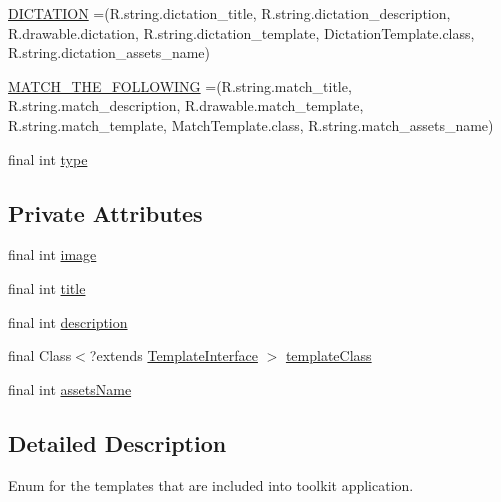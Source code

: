 \begin{DoxyCompactItemize}
\item 
\hyperlink{enumorg_1_1buildmlearn_1_1toolkit_1_1model_1_1Template_a878f3878c06d1f9e5c2719c0116f3ce6}{D\+I\+C\+T\+A\+T\+I\+ON} =(R.\+string.\+dictation\+\_\+title, R.\+string.\+dictation\+\_\+description, R.\+drawable.\+dictation, R.\+string.\+dictation\+\_\+template, Dictation\+Template.\+class, R.\+string.\+dictation\+\_\+assets\+\_\+name)
\item 
\hyperlink{enumorg_1_1buildmlearn_1_1toolkit_1_1model_1_1Template_a813519a1b5f6ac6fc392396d57698a12}{M\+A\+T\+C\+H\+\_\+\+T\+H\+E\+\_\+\+F\+O\+L\+L\+O\+W\+I\+NG} =(R.\+string.\+match\+\_\+title, R.\+string.\+match\+\_\+description, R.\+drawable.\+match\+\_\+template, R.\+string.\+match\+\_\+template, Match\+Template.\+class, R.\+string.\+match\+\_\+assets\+\_\+name)
\item 
final int \hyperlink{enumorg_1_1buildmlearn_1_1toolkit_1_1model_1_1Template_a1ac0921d037d111c6d9a98c659b6de74}{type}
\end{DoxyCompactItemize}
\subsection*{Private Attributes}
\begin{DoxyCompactItemize}
\item 
final int \hyperlink{enumorg_1_1buildmlearn_1_1toolkit_1_1model_1_1Template_af9b3693a4fd2a12e49bbfa55a6ac2d3a}{image}
\item 
final int \hyperlink{enumorg_1_1buildmlearn_1_1toolkit_1_1model_1_1Template_a112206e1cf6d9b50a0def584ee53529a}{title}
\item 
final int \hyperlink{enumorg_1_1buildmlearn_1_1toolkit_1_1model_1_1Template_a009374cd67d17445cfc0787899697a17}{description}
\item 
final Class$<$?extends \hyperlink{interfaceorg_1_1buildmlearn_1_1toolkit_1_1model_1_1TemplateInterface}{Template\+Interface} $>$ \hyperlink{enumorg_1_1buildmlearn_1_1toolkit_1_1model_1_1Template_a6a200b7fbb36356e5afe60983256bd68}{template\+Class}
\item 
final int \hyperlink{enumorg_1_1buildmlearn_1_1toolkit_1_1model_1_1Template_a5f0fc0ba241acdfafe1564cfce9e72fb}{assets\+Name}
\end{DoxyCompactItemize}


\subsection{Detailed Description}
Enum for the templates that are included into toolkit application. 

